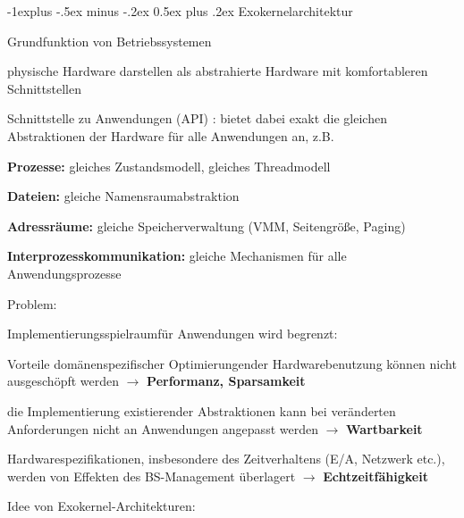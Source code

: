 \documentclass[a4paper]{article}
\makeatletter
\renewcommand{\subsection}{\@startsection{subsection}{2}{0mm}%
 {-1explus -.5ex minus -.2ex}%
 {0.5ex plus .2ex}%
 {\normalfont\normalsize\bfseries}}
\makeatother
\begin{document}
\begin{multicols}{3}
    \subsection{Exokernelarchitektur}

    \begin{itemize*}
        \item
        Grundfunktion von Betriebssystemen
        \begin{itemize*}
            \item physische Hardware darstellen als abstrahierte Hardware mit komfortableren Schnittstellen
            \item Schnittstelle zu Anwendungen (API) : bietet dabei exakt die gleichen Abstraktionen der Hardware für alle Anwendungen an, z.B. \begin{itemize*} \item \textbf{Prozesse:} gleiches Zustandsmodell, gleiches Threadmodell \item \textbf{Dateien:} gleiche Namensraumabstraktion \item \textbf{Adressräume:} gleiche Speicherverwaltung (VMM, Seitengröße, Paging) \item \textbf{Interprozesskommunikation:} gleiche Mechanismen für alle Anwendungsprozesse \end{itemize*}
        \end{itemize*}
        \item
        Problem:
        \begin{itemize*}
            \item Implementierungsspielraumfür Anwendungen wird begrenzt:
        \end{itemize*}
        \begin{enumerate*}

            \item Vorteile domänenspezifischer Optimierungender Hardwarebenutzung können nicht ausgeschöpft werden $\rightarrow$ \textbf{Performanz, Sparsamkeit}
            \item die Implementierung existierender Abstraktionen kann bei veränderten Anforderungen nicht an Anwendungen angepasst werden $\rightarrow$ \textbf{Wartbarkeit}
            \item Hardwarespezifikationen, insbesondere des Zeitverhaltens (E/A, Netzwerk etc.), werden von Effekten des BS-Management überlagert $\rightarrow$ \textbf{Echtzeitfähigkeit}
        \end{enumerate*}
        \item
        Idee von Exokernel-Architekturen:
    \end{itemize*}



\end{multicols}
\end{document}
